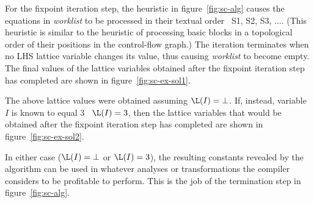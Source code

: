 For the fixpoint iteration step, the heuristic in
figure~\ref{fig:sc-alg} causes the equations in {\it worklist} to be
processed in their textual order \ie\ S1, S2, S3, $\ldots$.  
(This heuristic
is similar to the heuristic of processing basic blocks in 
a topological order of their positions in the control-flow graph.)
The
iteration terminates when no LHS lattice variable changes its value,
thus causing {\it worklist} to become empty.  The final values of
the lattice variables obtained
after the fixpoint iteration step has completed are shown in
figure~\ref{fig:sc-ex-sol1}.


The above lattice values were obtained assuming $\L(I) = \bot$.  If, instead,
variable $I$ is known to equal 3 \ie\ $\L(I) = 3$, then 
the lattice variables that would be obtained
after the fixpoint iteration step has completed are shown in
figure~\ref{fig:sc-ex-sol2}.

In either case ($\L(I) = \bot$ or $\L(I) = 3$), the resulting constants
revealed by the algorithm can be used in whatever analyses or
transformations the compiler considers to 
be profitable to perform.  This is the job
of the termination
step in figure~\ref{fig:sc-alg}.


